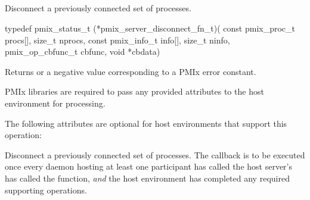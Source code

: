 \subsection{}

\summary

Disconnect a previously connected set of processes.

\format

\cspecificstart
\begin{codepar}
typedef pmix_status_t (*pmix_server_disconnect_fn_t)(
                             const pmix_proc_t procs[],
                             size_t nprocs,
                             const pmix_info_t info[],
                             size_t ninfo,
                             pmix_op_cbfunc_t cbfunc,
                             void *cbdata)
\end{codepar}
\cspecificend

\begin{arglist}
\end{arglist}

Returns  or a negative value corresponding to a \ac{PMIx} error constant.

\reqattrstart
\ac{PMIx} libraries are required to pass any provided attributes to the host environment for processing.
\reqattrend

\optattrstart
The following attributes are optional for host environments that support this operation:


\optattrend

\descr

Disconnect a previously connected set of processes. The callback is to be executed once every daemon hosting at least one participant has called the host server's has called the  function, \textit{and} the host environment has completed any required supporting operations.


